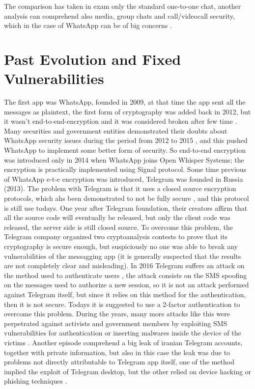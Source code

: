 \documentclass{article}
\begin{document}
The comparison has taken in exam only the standard one-to-one chat, another analysis can comprehend also media, group chats and call/videocall security, which in the case of WhatsApp can be of big concerns \cite{what_security_threat}.
 

\section{Past Evolution and Fixed Vulnerabilities}

The first app was WhatsApp, founded in 2009, at that time the app sent all the messages as plaintext, the first form of cryptography was added back in 2012, but it wasn't end-to-end-encryption and it was considered broken after few time \cite{what_threat}. Many securities and government entities demonstrated their doubts about WhatsApp security issues during the period from 2012 to 2015 \cite{what_threat}, and this pushed WhatsApp to implement some better form of security. So end-to-end encryption was introduced only in 2014 \cite{what_ete} when WhatsApp joins Open Whisper Systems; the encryption is practically implemented using Signal protocol. Some time previous of WhatsApp e-t-e encryption was introduced, Telegram was founded in Russia (2013). The problem with Telegram is that it uses a closed source encryption protocols, which ahs been  demonstrated to not be fully secure \cite{MT_insecure}, and this protocol is still use todays. One year after Telegram foundation, their creators affirm that all the source code will eventually be released, but only the client code was released, the server side is still closed source. To overcome this problem, the Telegram company organized two cryptoanalysis contests \cite{contest1} \cite{contest1} to prove that its cryptography is secure enough, but suspiciously no one was able to break any vulnerabilities of the messagging app (it is generally suspected that the results are not completely clear and misleading). \newline
In 2016 Telegram suffers an attack on the method used to authenticate users \cite{2factor}, the attack consists on the SMS spoofing on the messages used to authorize a new session, so it is not an attack performed against Telegram itself, but since it relies on this method for the authentication, then it is not secure. Todays it is suggested to use a 2-factor authentication to overcome this problem. During the years, many more attacks like this were perpetrated against activists and government members by exploiting SMS vulnerabilities for authentication or inserting malwares inside the device of the victims \cite{brasil_leak} \cite{russia_leak} \cite{telegram_gate}. Another episode comprehend a big leak of iranian Telegram accounts, together with private information, but also in this case the leak was due to problems not directly attributable to Telegram app itself, one of the method implied the exploit of Telegram desktop, but the other relied on device hacking or phishing techniques \cite{iran_leak}. \newline
\end{document}

